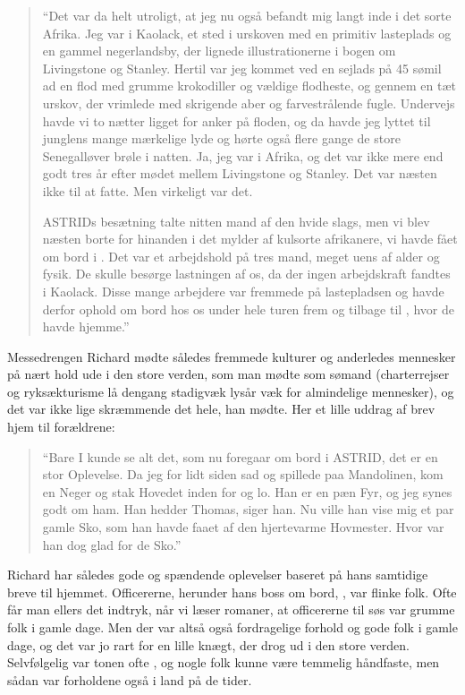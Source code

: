 \begin{quote}

    ``Det var da helt utroligt, at jeg nu også befandt mig langt inde i
    det sorte Afrika. Jeg var i Kaolack, et sted i urskoven med en
    primitiv lasteplads og en gammel negerlandsby, der lignede
    illustrationerne i bogen om Livingstone og Stanley. Hertil var jeg
    kommet ved en sejlads på 45 sømil ad en flod med grumme krokodiller
    og vældige flodheste, og gennem en tæt urskov, der vrimlede med
    skrigende aber og farvestrålende fugle. Undervejs havde vi to nætter
    ligget for anker på floden, og da havde jeg lyttet til junglens mange
    mærkelige lyde og hørte også flere gange de store Senegalløver brøle
    i natten. Ja, jeg var i Afrika, og det var ikke mere end godt tres år
    efter mødet mellem Livingstone og Stanley. Det var næsten ikke til at
    fatte. Men virkeligt var det.
    
    ASTRIDs besætning talte nitten mand af den hvide slags, men vi blev
    næsten borte for hinanden i det mylder af kulsorte afrikanere, vi
    havde fået om bord i . Det var et arbejdshold på tres
    mand, meget uens af alder og fysik. De skulle besørge lastningen af
    os, da der ingen arbejdskraft fandtes i Kaolack.  Disse mange
    arbejdere var fremmede på lastepladsen og havde derfor ophold om bord
    hos os under hele turen frem og tilbage til , hvor de
    havde hjemme.'' 
    
\end{quote}

Messedrengen Richard mødte således fremmede kulturer og anderledes
mennesker på nært hold ude i den store verden, som man mødte som sømand
(charterrejser og ryksækturisme lå dengang stadigvæk lysår væk for
almindelige mennesker), og det var ikke lige skræmmende det hele, han
mødte. Her et lille uddrag af brev hjem til forældrene:

\begin{quote}

    ``Bare I kunde se alt det, som nu foregaar om bord i ASTRID, det er
    en stor Oplevelse. Da jeg for lidt siden sad og spillede paa
    Mandolinen, kom en Neger og stak Hovedet inden for og lo. Han er en
    pæn Fyr, og jeg synes godt om ham. Han hedder Thomas, siger han. Nu
    ville han vise mig et par gamle Sko, som han havde faaet af den
    hjertevarme Hovmester. Hvor var han dog glad for de Sko.'' 
    
\end{quote}

Richard har således gode og spændende oplevelser baseret på hans
samtidige breve til hjemmet. Officererne, herunder hans boss om bord,
, var flinke folk. Ofte får man ellers det indtryk, når
vi læser romaner, at officererne til søs var grumme folk i gamle dage.
Men der var altså også fordragelige forhold og gode folk i gamle dage, og
det var jo rart for en lille knægt, der drog ud i den store verden.
Selvfølgelig var tonen ofte , og nogle folk kunne være temmelig
håndfaste, men sådan var forholdene også i land på de tider.


